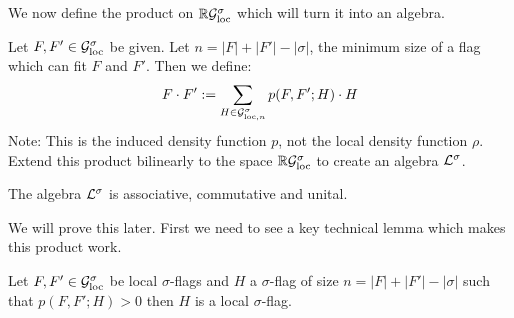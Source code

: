 We now define the product on $\mathbb{R}\mathcal{G}_\text{loc}^\sigma$ which will turn it into an algebra.

\begin{definition}
    Let $F, F'\in\mathcal{G}_\text{loc}^\sigma$ be given. Let $n=|F|+|F'|-|\sigma|$, the minimum size of
    a flag which can fit $F$ and $F'$. Then we define:
    \[
        F \cdot F' := \sum_{H \in \mathcal{G}_{\text{loc},n}^\sigma} p(F, F'; H) \cdot H
    \]
    Note: This is the induced density function $p$, not the local density function $\rho$.
    Extend this product bilinearly to the space $\mathbb{R}\mathcal{G}_\text{loc}^\sigma$ to create an algebra
    $\mathcal{L}^\sigma$.
\end{definition}

\begin{lemma}
    The algebra $\mathcal{L}^\sigma$ is associative, commutative and unital.
\end{lemma}

We will prove this later. First we need to see a key technical lemma which makes this
product work.

\begin{lemma}
    Let $F, F' \in \mathcal{G}_\text{loc}^\sigma$ be local $\sigma$-flags and $H$ a $\sigma$-flag
    of size $n=|F|+|F'|-|\sigma|$ such that $p(F, F'; H) > 0$ then $H$ is a local
    $\sigma$-flag.
\end{lemma}


